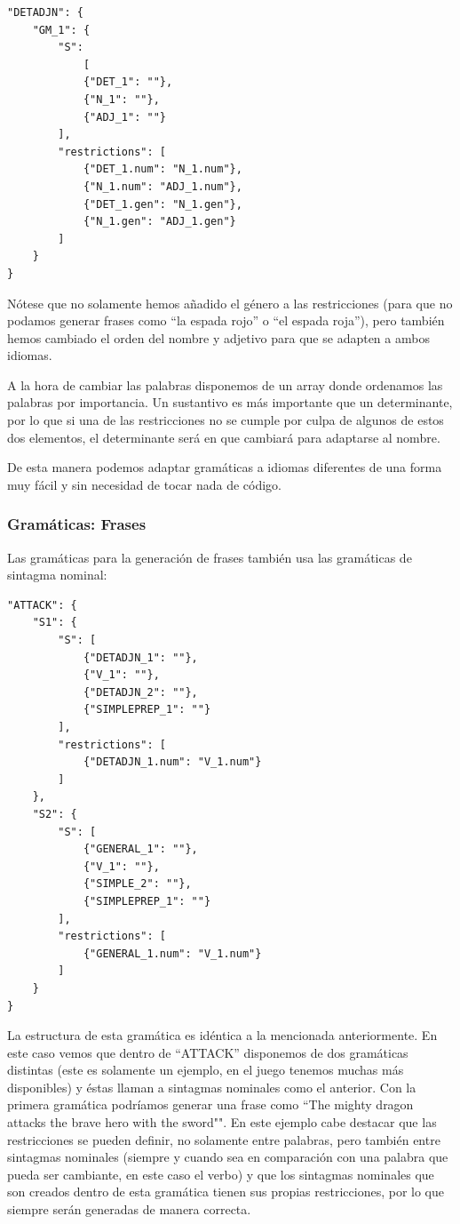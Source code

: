 \begin{lstlisting}[style=json]
"DETADJN": {
    "GM_1": {
        "S": 
            [
            {"DET_1": ""},
            {"N_1": ""},
            {"ADJ_1": ""}
        ],
        "restrictions": [
            {"DET_1.num": "N_1.num"},
            {"N_1.num": "ADJ_1.num"},
            {"DET_1.gen": "N_1.gen"},
            {"N_1.gen": "ADJ_1.gen"}
        ]
    }
}
\end{lstlisting}

Nótese que no solamente hemos añadido el género a las restricciones (para que no podamos generar frases como ``la espada rojo'' o ``el espada roja''), pero también hemos cambiado el orden del nombre y adjetivo para que se adapten a ambos idiomas. 

A la hora de cambiar las palabras disponemos de un array donde ordenamos las palabras por importancia. Un sustantivo es más importante que un determinante, por lo que si una de las restricciones no se cumple por culpa de algunos de estos dos elementos, el determinante será en que cambiará para adaptarse al nombre.

De esta manera podemos adaptar gramáticas a idiomas diferentes de una forma muy fácil y sin necesidad de tocar nada de código.

\subsubsection{Gramáticas: Frases}

Las gramáticas para la generación de frases también usa las gramáticas de sintagma nominal: 

\begin{lstlisting}[style=json]
"ATTACK": {
	"S1": {
	    "S": [
	        {"DETADJN_1": ""},
	        {"V_1": ""},
	        {"DETADJN_2": ""},
	        {"SIMPLEPREP_1": ""}
	    ],
	    "restrictions": [
	        {"DETADJN_1.num": "V_1.num"}
	    ]
	},
	"S2": {
	    "S": [
	        {"GENERAL_1": ""},
	        {"V_1": ""},
	        {"SIMPLE_2": ""},
	        {"SIMPLEPREP_1": ""}
	    ],
	    "restrictions": [
	        {"GENERAL_1.num": "V_1.num"}
	    ]
	}
}
\end{lstlisting}

La estructura de esta gramática es idéntica a la mencionada anteriormente. En este caso vemos que dentro de ``ATTACK'' disponemos de dos gramáticas distintas (este es solamente un ejemplo, en el juego tenemos muchas más disponibles) y éstas llaman a sintagmas nominales como el anterior.
Con la primera gramática podríamos generar una frase como ``The mighty dragon attacks the brave hero with the sword"". En este ejemplo cabe destacar que las restricciones se pueden definir, no solamente entre palabras, pero también entre sintagmas nominales (siempre y cuando sea en comparación con una palabra que pueda ser cambiante, en este caso el verbo) y que los sintagmas nominales que son creados dentro de esta gramática tienen sus propias restricciones, por lo que siempre serán generadas de manera correcta.

